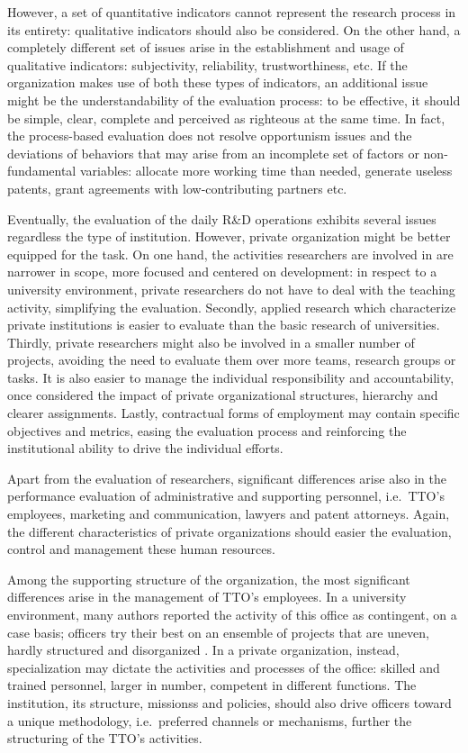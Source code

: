 However, a set of quantitative indicators cannot represent the research process in its entirety: qualitative indicators should also be considered. On the other hand, a completely different set of issues arise in the establishment and usage of qualitative indicators: subjectivity, reliability, trustworthiness, etc. If the organization makes use of both these types of indicators, an additional issue might be the understandability of the evaluation process: to be effective, it should be simple, clear, complete and perceived as righteous at the same time. In fact, the process-based evaluation does not resolve opportunism issues and the deviations of behaviors that may arise from an incomplete set of factors or non-fundamental variables: allocate more working time than needed, generate useless patents, grant agreements with low-contributing partners etc. 

Eventually, the evaluation of the daily R\&D operations exhibits several issues regardless the type of institution. However, private organization might be better equipped for the task. On one hand, the activities researchers are involved in are narrower in scope, more focused and centered on development: in respect to a university environment, private researchers do not have to deal with the teaching activity, simplifying the evaluation. Secondly, applied research which characterize private institutions is easier to evaluate than the basic research of universities. Thirdly, private researchers might also be involved in a smaller number of projects, avoiding the need to evaluate them over more teams, research groups or tasks. It is also easier to manage the individual responsibility and accountability, once considered the impact of private organizational structures, hierarchy and clearer assignments. Lastly, contractual forms of employment may contain specific objectives and metrics, easing the evaluation process and reinforcing the institutional ability to drive the individual efforts. 

Apart from the evaluation of researchers, significant differences arise also in the performance evaluation of administrative and supporting personnel, i.e.\ TTO's employees, marketing and communication, lawyers and patent attorneys. Again, the different characteristics of private organizations should easier the evaluation, control and management these human resources.

Among the supporting structure of the organization, the most significant differences arise in the management of TTO's employees. In a university environment, many authors reported the activity of this office as contingent, on a case basis; officers try their best on an ensemble of projects that are uneven, hardly structured and disorganized \citep{Jensen2003}. In a private organization, instead, specialization may dictate the activities and processes of the office: skilled and trained personnel, larger in number, competent in different functions. The institution, its structure, missionss and policies, should also drive officers toward a unique methodology, i.e.\ preferred channels or mechanisms, further the structuring of the TTO's activities. 


